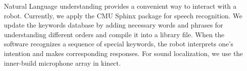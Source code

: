 Natural Language understanding provides a convenient way to interact with a robot. Currently, we apply the CMU Sphinx package\cite{lamere2003cmu} for speech recognition. We update the keywords database by adding necessary words and phrases for understanding different orders and compile it into a library file. When the software recognizes a sequence of special keywords, the robot interprets one's intention and makes corresponding responses. For sound localization, we use the inner-build microphone array in kinect.
